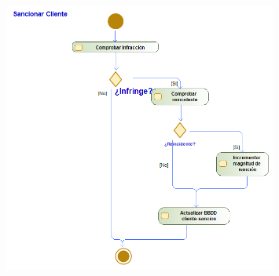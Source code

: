 \begin{figure}[H]
    \centering
    \includegraphics[width=0.8\textwidth]{Use_Cases/Sancionar Cliente.png}
\end{figure}
\newpage
